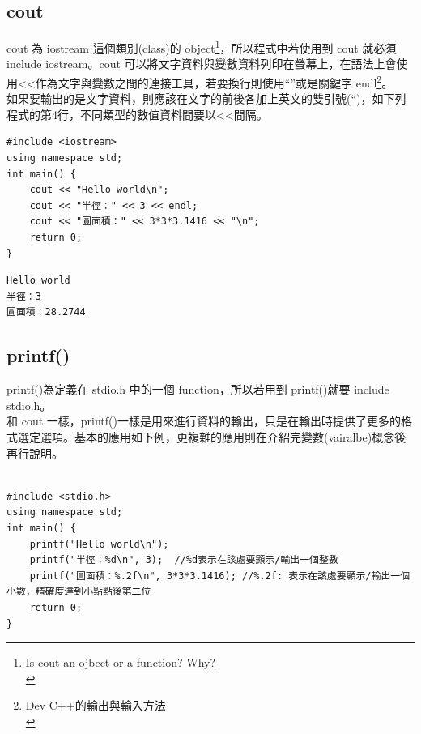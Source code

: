 \documentclass[a4paper,12pt]{article}
\begin{document}
\subsection{cout}
\label{sec:orgff408ef}
cout 為 iostream 這個類別(class)的 object\footnote{\href{https://www.quora.com/Is-cout-an-object-or-a-function-Why}{Is cout an ojbect or a function? Why?}\\}，所以程式中若使用到 cout 就必須 include iostream。cout 可以將文字資料與變數資料列印在螢幕上，在語法上會使用<<作為文字與變數之間的連接工具，若要換行則使用``\n''或是關鍵字 endl\footnote{\href{http://rs2.ocu.edu.tw/\~jengchi/IO\_instruction.htm}{Dev C++的輸出與輸入方法}\\}。\\

如果要輸出的是文字資料，則應該在文字的前後各加上英文的雙引號(``)，如下列程式的第4行，不同類型的數值資料間要以<<間隔。\\

\lstset{breaklines=true,language=cpp,label= ,caption= ,captionpos=b,firstnumber=1,numbers=left}
\begin{lstlisting}
#include <iostream>
using namespace std;
int main() {
    cout << "Hello world\n";
    cout << "半徑：" << 3 << endl;
    cout << "圓面積：" << 3*3*3.1416 << "\n";
    return 0;
}
\end{lstlisting}

\begin{verbatim}
Hello world
半徑：3
圓面積：28.2744
\end{verbatim}

\subsection{printf()}
\label{cpp_printf}
printf()為定義在 stdio.h 中的一個 function，所以若用到 printf()就要 include stdio.h。\\

和 cout 一樣，printf()一樣是用來進行資料的輸出，只是在輸出時提供了更多的格式選定選項。基本的應用如下例，更複雜的應用則在介紹完變數(vairalbe)概念後再行說明。\\
\lstset{breaklines=true,language=cpp,label= ,caption= ,captionpos=b,firstnumber=1,numbers=left}
\begin{lstlisting}

#include <stdio.h>
using namespace std;
int main() {
    printf("Hello world\n");
    printf("半徑：%d\n", 3);  //%d表示在該處要顯示/輸出一個整數
    printf("圓面積：%.2f\n", 3*3*3.1416); //%.2f: 表示在該處要顯示/輸出一個小數，精確度達到小點點後第二位
    return 0;
}
\end{lstlisting}
\end{document}
